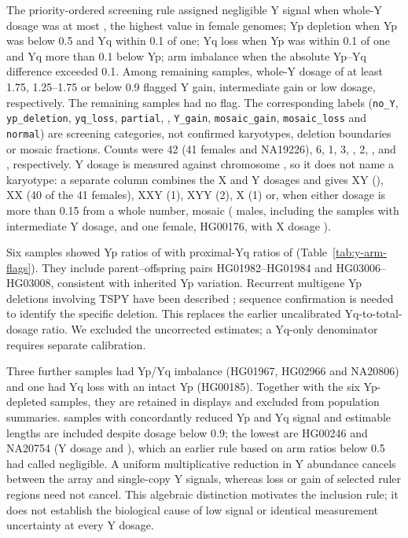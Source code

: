 The priority-ordered screening rule assigned negligible Y signal when whole-Y dosage was at most , the highest value in  female genomes; Yp depletion when Yp was below 0.5 and Yq within 0.1 of one; Yq loss when Yp was within 0.1 of one and Yq more than 0.1 below Yp; arm imbalance when the absolute Yp--Yq difference exceeded 0.1. Among remaining samples, whole-Y dosage of at least 1.75, 1.25--1.75 or below 0.9 flagged Y gain, intermediate gain or low dosage, respectively. The remaining samples had no flag. The corresponding labels (\texttt{no\_Y}, \texttt{yp\_deletion}, \texttt{yq\_loss}, \texttt{partial}, , \texttt{Y\_gain}, \texttt{mosaic\_gain}, \texttt{mosaic\_loss} and \texttt{normal}) are screening categories, not confirmed karyotypes, deletion boundaries or mosaic fractions. Counts were 42 (41 females and NA19226), 6, 1, 3, , 2, ,  and , respectively. Y dosage is measured against chromosome , so it does not name a karyotype: a separate column combines the X and Y dosages and gives XY (), XX (40 of the 41 females), XXY (1), XYY (2), X (1) or, when either dosage is more than 0.15 from a whole number, mosaic ( males, including the samples with intermediate Y dosage, and one female, HG00176, with X dosage ).

Six samples showed Yp ratios of  with proximal-Yq ratios of  (Table~\ref{tab:y-arm-flags}). They include parent--offspring pairs HG01982--HG01984 and HG03006--HG03008, consistent with inherited Yp variation. Recurrent multigene Yp deletions involving TSPY have been described \cite{Jobling2007}; sequence confirmation is needed to identify the specific deletion.  This replaces the earlier uncalibrated Yq-to-total-dosage ratio. We excluded the uncorrected estimates; a Yq-only denominator requires separate calibration.

Three further samples had Yp/Yq imbalance (HG01967, HG02966 and NA20806) and one had Yq loss with an intact Yp (HG00185). Together with the six Yp-depleted samples, they are retained in displays and excluded from population summaries.  samples with concordantly reduced Yp and Yq signal and estimable lengths are included despite dosage below 0.9; the lowest are HG00246 and NA20754 (Y dosage  and ), which an earlier rule based on arm ratios below 0.5 had called negligible. A uniform multiplicative reduction in Y abundance cancels between the array and single-copy Y signals, whereas loss or gain of selected ruler regions need not cancel. This algebraic distinction motivates the inclusion rule; it does not establish the biological cause of low signal or identical measurement uncertainty at every Y dosage.

